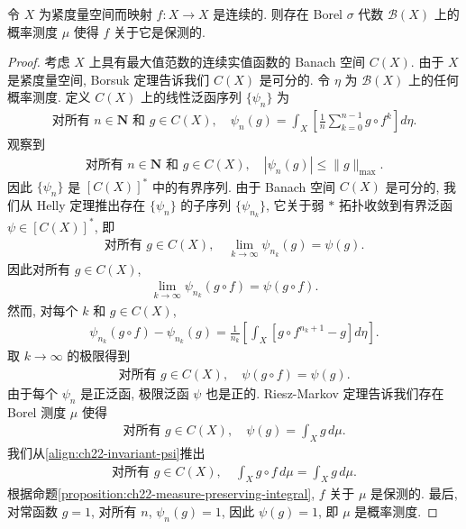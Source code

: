 \documentclass[../../main.tex]{subfiles}
\begin{document}
\begin{theorem}\label{theorem:ch22-bogoliubov-krilov}
令 $X$ 为紧度量空间而映射 $f:X\to X$ 是连续的. 则存在 Borel $\sigma$ 代数 $\mathcal{B}(X)$ 上的概率测度 $\mu$ 使得 $f$ 关于它是保测的.
\end{theorem}

\begin{proof}
考虑 $X$ 上具有最大值范数的连续实值函数的 Banach 空间 $C(X)$. 由于 $X$ 是紧度量空间, Borsuk 定理告诉我们 $C(X)$ 是可分的. 令 $\eta$ 为 $\mathcal{B}(X)$ 上的任何概率测度. 定义 $C(X)$ 上的线性泛函序列 $\{\psi_{n}\}$ 为
\begin{align}
\text{对所有 }n\in\mathbf{N}\text{ 和 }g\in C(X),\quad\psi_{n}(g)=\int_{X}\left[\frac{1}{n}\sum_{k=0}^{n-1}g\circ f^{k}\right]d\eta.
\label{align:ch22-cyclic-average}
\end{align}
观察到
\begin{align*}
\text{对所有 }n\in\mathbf{N}\text{ 和 }g\in C(X),\quad|\psi_{n}(g)|\leqslant\|g\|_{\max}.
\end{align*}
因此 $\{\psi_{n}\}$ 是 $[C(X)]^{*}$ 中的有界序列. 由于 Banach 空间 $C(X)$ 是可分的, 我们从 Helly 定理推出存在 $\{\psi_{n}\}$ 的子序列 $\{\psi_{n_{k}}\}$, 它关于弱 $*$ 拓扑收敛到有界泛函 $\psi\in[C(X)]^{*}$, 即
\begin{align*}
\text{对所有 }g\in C(X),\quad\lim_{k\to\infty}\psi_{n_{k}}(g)=\psi(g).
\end{align*}
因此对所有 $g\in C(X)$,
\begin{align*}
\lim_{k\to\infty}\psi_{n_{k}}(g\circ f)=\psi(g\circ f).
\end{align*}
然而, 对每个 $k$ 和 $g\in C(X)$,
\begin{align*}
\psi_{n_{k}}(g\circ f)-\psi_{n_{k}}(g)=\frac{1}{n_{k}}\left[\int_{X}[g\circ f^{n_{k}+1}-g]d\eta\right].
\end{align*}
取 $k\to\infty$ 的极限得到
\begin{align}
\text{对所有 }g\in C(X),\quad\psi(g\circ f)=\psi(g).
\label{align:ch22-invariant-psi}
\end{align}
由于每个 $\psi_{n}$ 是正泛函, 极限泛函 $\psi$ 也是正的. Riesz-Markov 定理告诉我们存在 Borel 测度 $\mu$ 使得
\begin{align*}
\text{对所有 }g\in C(X),\quad\psi(g)=\int_{X}g\,d\mu.
\end{align*}
我们从\eqref{align:ch22-invariant-psi}推出
\begin{align*}
\text{对所有 }g\in C(X),\quad\int_{X}g\circ f\,d\mu=\int_{X}g\,d\mu.
\end{align*}
根据命题\cref{proposition:ch22-measure-preserving-integral}, $f$ 关于 $\mu$ 是保测的. 最后, 对常函数 $g=1$, 对所有 $n$, $\psi_{n}(g)=1$, 因此 $\psi(g)=1$, 即 $\mu$ 是概率测度.
\end{proof}
\end{document}
